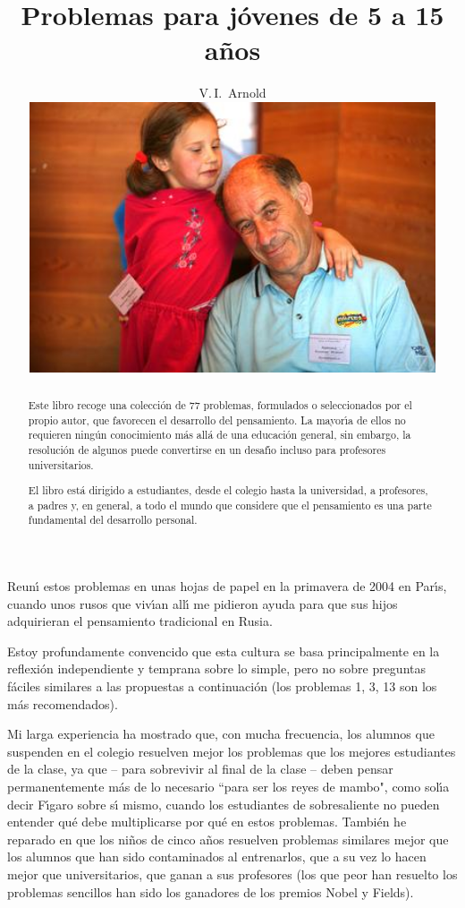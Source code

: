 \documentclass[12pt]{article}  %
\title{Problemas para j\'{o}venes de 5 a 15 a\~{n}os}
\author{V.\,I.~Arnold
\vspace*{2cm}\\ 
\includegraphics[width=12cm]{photo-arnold_small}
}
\date{}
\begin{document}
\def\eps{\varepsilon}
\maketitle
\thispagestyle{empty}

\newpage 
\setcounter{page}{1}
\begin{abstract}

Este libro recoge una colecci\'on de 77 problemas, formulados o seleccionados por el propio autor, 
que favorecen el desarrollo del pensamiento.
La mayor\'{\i}a de ellos no requieren ning\'un conocimiento m\'as all\'a de una educaci\'on general, 
sin embargo, la resoluci\'on de algunos puede convertirse en un desaf\'{\i}o incluso para profesores 
universitarios.

El libro est\'a dirigido a estudiantes, desde el colegio hasta la universidad, a profesores, 
a padres y, en general, a todo el mundo que considere que el pensamiento es una parte fundamental del desarrollo personal.
\end{abstract}

\newpage


Reun\'{\i} estos problemas en unas hojas de papel en la primavera de 2004 en Par\'{\i}s, cuando unos rusos 
que viv\'{\i}an all\'{\i} me pidieron ayuda para que sus hijos adquirieran el pensamiento tradicional en Rusia.

Estoy profundamente convencido que esta cultura se basa principalmente en la reflexi\'on independiente y
temprana sobre lo simple, pero no sobre preguntas f\'aciles similares a las propuestas a continuaci\'on 
(los problemas 1, 3, 13 son los m\'as recomendados).

Mi larga experiencia ha mostrado que, con mucha frecuencia, los alumnos que suspenden en el colegio 
resuelven mejor los problemas que los mejores estudiantes de la clase, ya que -- para sobrevivir al final
 de la clase -- deben pensar permanentemente m\'as de lo necesario ``para ser los reyes de mambo", 
 como sol\'{\i}a decir F\'{\i}garo sobre s\'{\i} mismo,
cuando los estudiantes de sobresaliente no pueden entender qu\'e debe multiplicarse por qu\'e en estos problemas.
Tambi\'en he reparado en que los ni\~nos de cinco a\~nos resuelven problemas similares mejor 
que los alumnos que han sido contaminados al entrenarlos, que a su vez lo hacen mejor que universitarios, 
que ganan a sus profesores (los que peor han resuelto los problemas sencillos han sido los ganadores de los premios 
Nobel y Fields).   

\ 
\end{document}
